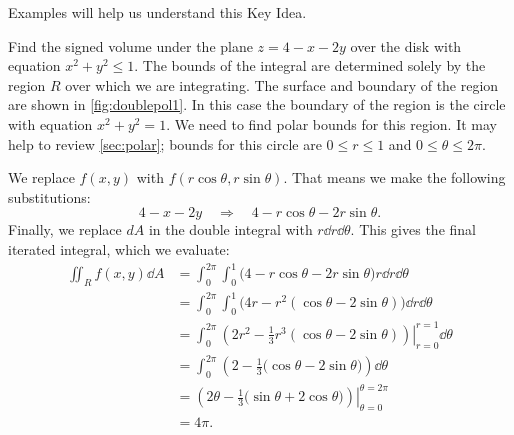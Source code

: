 
Examples will help us understand this Key Idea.

\begin{example}\label{ex_doublepol1}%
Find the signed volume under the plane $z=4-x-2y$ over the disk with equation $x^2+y^2\le1$.
\solution
{}%
%
The bounds of the integral are determined solely by the region $R$ over which we are integrating. The surface and boundary of the region are shown in \autoref{fig:doublepol1}. In this case the boundary of the region is the circle with equation $x^2+y^2=1$. We need to find polar bounds for this region. It may help to review \autoref{sec:polar}; bounds for this circle are $0\leq r\leq 1$ and $0\leq \theta\leq 2\pi$.

We replace $f(x,y)$ with $f(r\cos\theta,r\sin\theta)$. That means we make the following substitutions:
\[4-x-2y \quad \Rightarrow \quad 4-r\cos\theta-2r\sin\theta.\]
Finally, we replace $dA$ in the double integral with $r\dd r\dd\theta$. This gives the final iterated integral, which we evaluate:
\begin{align*}
\iint_Rf(x,y)\dd A
 &= \int_0^{2\pi}\int_0^1\bigl(4-r\cos\theta-2r\sin\theta\bigr)r\dd r\dd\theta\\
 &= \int_0^{2\pi}\int_0^1\bigl(4r-r^2(\cos\theta-2\sin\theta)\bigr)\dd r\dd\theta\\
 &= \int_0^{2\pi}\left.\left(2r^2-\frac13r^3(\cos\theta-2\sin\theta)\right)\right|_{r=0}^{r=1}\dd\theta\\
 &= \int_0^{2\pi} \left(2-\frac13\bigl(\cos\theta-2\sin\theta\bigr)\right)\dd\theta\\
 &= \left.\left(2\theta -\frac13\bigl(\sin\theta+2\cos\theta\bigr)\right)\right|_{\theta=0}^{\theta=2\pi} \\
 &= 4\pi %
 .
\end{align*}
\end{example}

